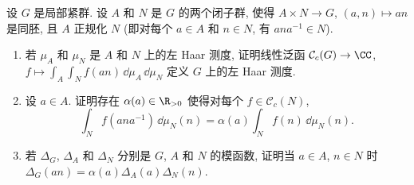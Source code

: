 \begin{exercise}[半直积的模函数]
\label{ex:I.5.3.6}
设 $G$ 是局部紧群. 设 $A$ 和 $N$ 是 $G$ 的两个闭子群, 使得 $A \times N \to G$, $(a, n) \longmapsto an$ 是同胚, 且 $A$ 正规化 $N$ (即对每个 $a \in A$ 和 $n \in N$, 有 $ana^{-1} \in N$).
\begin{enumerate}
\item[(a)] 若 $\mu_A$ 和 $\mu_N$ 是 $A$ 和 $N$ 上的左 Haar 测度, 证明线性泛函 $\mathcal{C}_c(G) \to \CC$, $f \longmapsto \int_A\int_N f(an)\,\dd\mu_A\,\dd\mu_N$ 定义 $G$ 上的左 Haar 测度.
\item[(b)] 设 $a \in A$. 证明存在 $\alpha(a) \in \R_{>0}$ 使得对每个 $f \in \mathcal{C}_c(N)$,
\[
\int_N f(ana^{-1})\,\dd\mu_N(n) = \alpha(a)\int_N f(n)\,\dd\mu_N(n).
\]
\item[(c)] 若 $\Delta_G$, $\Delta_A$ 和 $\Delta_N$ 分别是 $G$, $A$ 和 $N$ 的模函数, 证明当 $a \in A$, $n \in N$ 时 $\Delta_G(an) = \alpha(a)\Delta_A(a)\Delta_N(n)$.
\end{enumerate}
\end{exercise}

